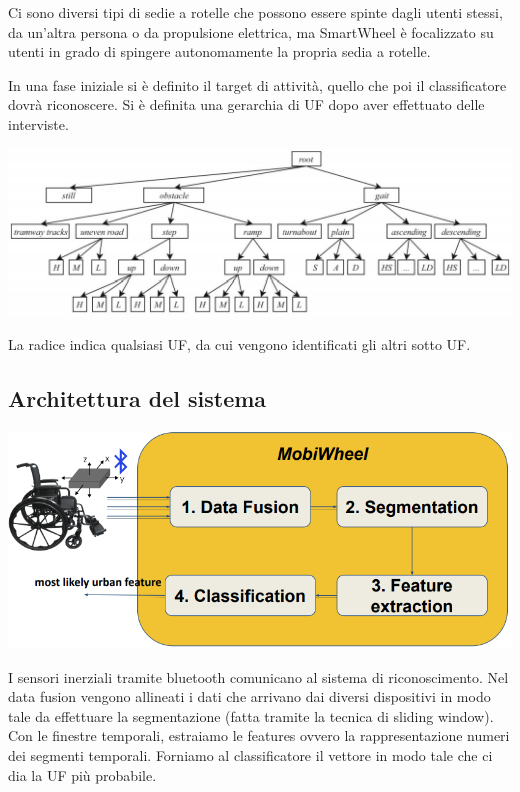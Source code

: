 Ci sono diversi tipi di sedie a rotelle che possono essere spinte dagli utenti stessi, da un'altra persona o da propulsione elettrica, ma SmartWheel è focalizzato su utenti in grado di spingere autonomamente la propria sedia a rotelle. 

In una fase iniziale si è definito il target di attività, quello che poi il classificatore dovrà riconoscere. Si è definita una gerarchia di UF dopo aver effettuato delle interviste.
\begin{center}
    \includegraphics[width=\textwidth]{images/MobiDEV/6. activity recognition/smart wheel.PNG}
\end{center}
La radice indica qualsiasi UF, da cui vengono identificati gli altri sotto UF.


\subsection{Architettura del sistema}
\begin{center}
    \includegraphics[width=.9\textwidth]{images/MobiDEV/6. activity recognition/smart wheel - architettura.PNG}
\end{center}
I sensori inerziali tramite bluetooth comunicano al sistema di riconoscimento.
Nel data fusion vengono allineati i dati che arrivano dai diversi dispositivi in modo tale da effettuare la segmentazione (fatta tramite la tecnica di sliding window).
Con le finestre temporali, estraiamo le features ovvero la rappresentazione numeri dei segmenti temporali. Forniamo al classificatore il vettore in modo tale che ci dia la UF più probabile.

